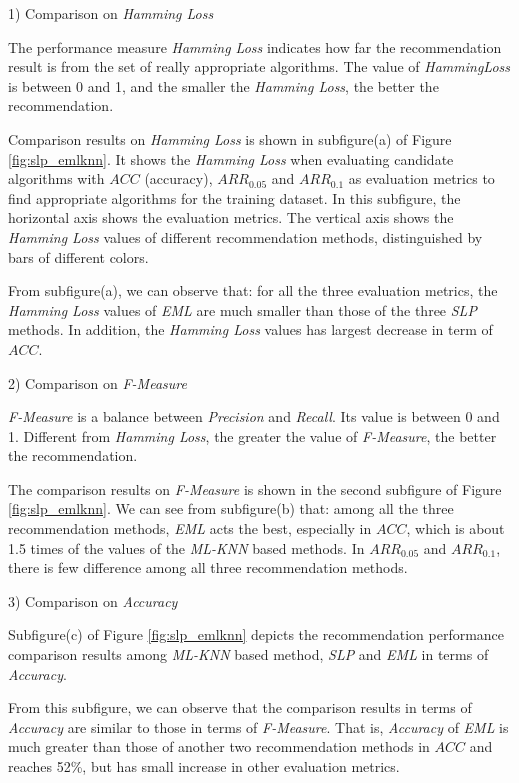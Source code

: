 \documentclass[review,3p,twocolumn,times]{elsarticle}
\begin{document}
1) Comparison on \emph{Hamming Loss}

The performance measure \emph{Hamming Loss} indicates how far the recommendation result is from the set of really appropriate algorithms. The value of \emph{HammingLoss} is between 0 and 1, and the smaller the \emph{Hamming Loss}, the better the recommendation. 

Comparison results on \emph{Hamming Loss} is shown in subfigure(a) of Figure \ref{fig:slp_emlknn}. It shows the \emph{Hamming Loss} when evaluating candidate algorithms with $ACC$ (accuracy), $ARR_{0.05}$ and $ARR_{0.1}$ as evaluation metrics to find appropriate algorithms for the training dataset. In this subfigure, the horizontal axis shows the evaluation metrics. The vertical axis shows the \emph{Hamming Loss} values of different recommendation methods, distinguished by bars of different colors. 

From subfigure(a), we can observe that: for all the three evaluation metrics, the \emph{Hamming Loss} values of \emph{EML} are much smaller than those of the three \emph{SLP} methods. In addition, the \emph{Hamming Loss} values has largest decrease in term of  $ACC$.

2) Comparison on \emph{F-Measure}

\emph{F-Measure} is a balance between \emph{Precision} and \emph{Recall}. Its value is between 0 and 1. Different from \emph{Hamming Loss}, the greater the value of \emph{F-Measure}, the better the recommendation. 

The comparison results on \emph{F-Measure} is shown in the second subfigure of Figure \ref{fig:slp_emlknn}. We can see from subfigure(b) that: among all the three recommendation methods, \emph{EML} acts the best, especially in $ACC$, which is about 1.5 times of the values of the \emph{ML-KNN} based methods. In $ARR_{0.05}$ and $ARR_{0.1}$, there is few difference among all three recommendation methods.

3) Comparison on \emph{Accuracy}

Subfigure(c) of Figure \ref{fig:slp_emlknn} depicts the recommendation performance comparison results among \emph{ML-KNN} based method, \emph{SLP} and \emph{EML} in terms of \emph{Accuracy}.

From this subfigure, we can observe that the comparison results in terms of \emph{Accuracy} are similar to those in terms of  \emph{F-Measure}. That is, \emph{Accuracy} of \emph{EML} is much greater than those of another two recommendation methods in $ACC$ and reaches 52\%, but has small increase in other evaluation metrics. 
\end{document}
